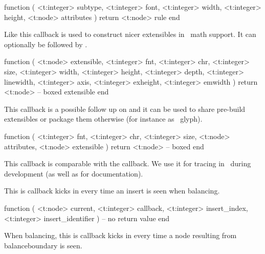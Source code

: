 \starttyping[option=LUA]
function (
    <t:integer> subtype,
    <t:integer> font,
    <t:integer> width,
    <t:integer> height,
    <t:node>    attributes
)
    return <t:node> rule
end
\stoptyping

\stopsubsection

\startsubsection[title=make_extensible]

Like  this callback is used to construct nicer extensibles in \CONTEXT\
math support. It can optionally be followed by .

\starttyping[option=LUA]
function (
    <t:node>    extensible,
    <t:integer> fnt,
    <t:integer> chr,
    <t:integer> size,
    <t:integer> width,
    <t:integer> height,
    <t:integer> depth,
    <t:integer> linewidth,
    <t:integer> axis,
    <t:integer> exheight,
    <t:integer> emwidth
)
    return <t:node> -- boxed extensible
end
\stoptyping

\stopsubsection

\startsubsection[title=register_extensible]

This callback is a possible follow up on  and it can be
used to share pre-build extensibles or package them otherwise (for instance as
\TYPETHREE\ glyph).

\starttyping[option=LUA]
function (
    <t:integer> fnt,
    <t:integer> chr,
    <t:integer> size,
    <t:node>    attributes,
    <t:node>    extensible
)
    return <t:node> -- boxed
end
\stoptyping

\stopsubsection

\startsubsection[title=balance]

This callback is comparable with the  callback. We use it for
tracing in \CONTEXT\ during development (as well as for documentation).

\stopsubsection

\startsubsection[title=balance_insert]

This is callback kicks in every time an insert is seen when balancing.

\starttyping[option=LUA]
function (
    <t:node>    current,
    <t:integer> callback,
    <t:integer> insert_index,
    <t:integer> insert_identifier
)
    -- no return value
end
\stoptyping

\stopsubsection

\startsubsection[title=balance_boundary]

When balancing, this is callback kicks in every time a node resulting from \prm
{balanceboundary} is seen.

